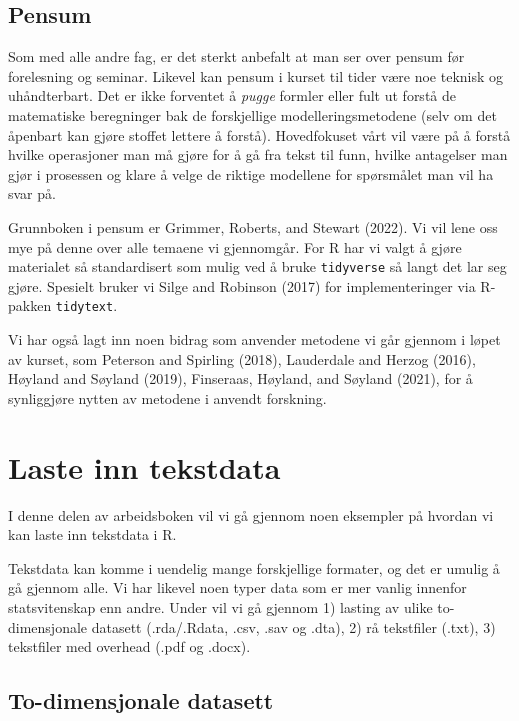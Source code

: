 \documentclass[
]{article}
\begin{document}
\hypertarget{pensum}{%
\subsection{Pensum}\label{pensum}}

Som med alle andre fag, er det sterkt anbefalt at man ser over pensum
før forelesning og seminar. Likevel kan pensum i kurset til tider være
noe teknisk og uhåndterbart. Det er ikke forventet å \emph{pugge}
formler eller fult ut forstå de matematiske beregninger bak de
forskjellige modelleringsmetodene (selv om det åpenbart kan gjøre
stoffet lettere å forstå). Hovedfokuset vårt vil være på å forstå hvilke
operasjoner man må gjøre for å gå fra tekst til funn, hvilke antagelser
man gjør i prosessen og klare å velge de riktige modellene for
spørsmålet man vil ha svar på.

Grunnboken i pensum er Grimmer, Roberts, and Stewart (2022). Vi vil lene
oss mye på denne over alle temaene vi gjennomgår. For R har vi valgt å
gjøre materialet så standardisert som mulig ved å bruke
\texttt{tidyverse} så langt det lar seg gjøre. Spesielt bruker vi Silge
and Robinson (2017) for implementeringer via R-pakken \texttt{tidytext}.

Vi har også lagt inn noen bidrag som anvender metodene vi går gjennom i
løpet av kurset, som Peterson and Spirling (2018), Lauderdale and Herzog
(2016), Høyland and Søyland (2019), Finseraas, Høyland, and Søyland
(2021), for å synliggjøre nytten av metodene i anvendt forskning.

\hypertarget{lastetekst}{%
\section{Laste inn tekstdata}\label{lastetekst}}

I denne delen av arbeidsboken vil vi gå gjennom noen eksempler på
hvordan vi kan laste inn tekstdata i R.

Tekstdata kan komme i uendelig mange forskjellige formater, og det er
umulig å gå gjennom alle. Vi har likevel noen typer data som er mer
vanlig innenfor statsvitenskap enn andre. Under vil vi gå gjennom 1)
lasting av ulike to-dimensjonale datasett (.rda/.Rdata, .csv, .sav og
.dta), 2) rå tekstfiler (.txt), 3) tekstfiler med overhead (.pdf og
.docx).

\hypertarget{to-dimensjonale-datasett}{%
\subsection{To-dimensjonale datasett}\label{to-dimensjonale-datasett}}
\end{document}
